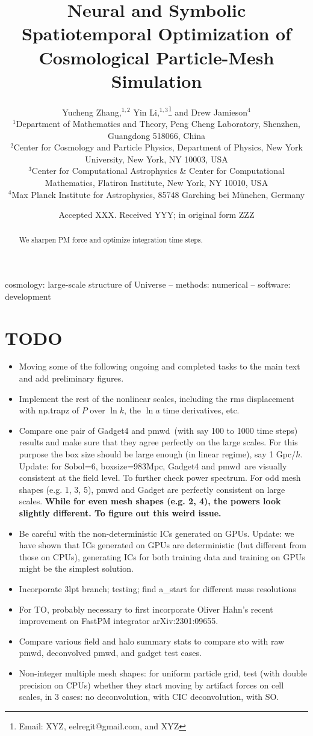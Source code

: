 \documentclass[usenatbib]{mnras}
\title[Spatiotemporally Optimized Simulation]
{Neural and Symbolic Spatiotemporal Optimization of Cosmological
Particle-Mesh Simulation}
\author[Zhang, Li, Jamieson, et al.]{
%
Yucheng Zhang,$^{1, 2}$
%
Yin Li,$^{1, 3}$\thanks{Email: XYZ, eelregit@gmail.com, and XYZ}
%
and Drew Jamieson$^{4}$
%
\\$^1$Department of Mathematics and Theory, Peng Cheng Laboratory,
Shenzhen, Guangdong 518066, China
%
\\$^2$Center for Cosmology and Particle Physics, Department of Physics,
New York University, New York, NY 10003, USA
%
\\$^3$Center for Computational Astrophysics \& Center for Computational
Mathematics, Flatiron Institute, New York, NY 10010, USA
%
\\$^4$Max Planck Institute for Astrophysics, 85748 Garching bei
M\"unchen, Germany
}
\date{Accepted XXX. Received YYY; in original form ZZZ}
\newcommand{\pmwd}{{\usefont{T1}{nova}{m}{sl}pmwd}}
\begin{document}
\label{firstpage}
\pagerange{\pageref{firstpage}--\pageref{lastpage}}
\maketitle



\begin{abstract}
We sharpen PM force and optimize integration time steps.
\end{abstract}

\begin{keywords}
cosmology: large-scale structure of Universe
-- methods: numerical
-- software: development
\end{keywords}



\section*{TODO}
\begin{itemize}
\item Moving some of the following ongoing and completed tasks to the
    main text and add preliminary figures.
\item Implement the rest of the nonlinear scales, including the rms
    displacement with np.trapz of $P$ over $\ln k$, the $\ln a$ time
    derivatives, etc.
\item Compare one pair of Gadget4 and \pmwd\ (with say 100 to 1000 time
    steps) results and make sure that they agree perfectly on the large
    scales. For this purpose the box size should be large enough (in
    linear regime), say 1 Gpc/$h$.\newline
    Update: for Sobol=6, boxsize=983Mpc, Gadget4 and \pmwd\ are visually
    consistent at the field level. To further check power spectrum. For odd mesh
    shapes (e.g. 1, 3, 5), pmwd and Gadget are perfectly consistent on large
    scales. \textbf{While for even mesh shapes (e.g. 2, 4), the powers look
    slightly different. To figure out this weird issue.}
\item Be careful with the non-deterministic ICs generated on GPUs.\newline
      Update: we have shown that ICs generated on GPUs are deterministic (but
      different from those on CPUs), generating ICs for both training data and
      training on GPUs might be the simplest solution.
\item Incorporate 3lpt branch; testing; find a\_start for different mass
  resolutions
\item For TO, probably necessary to first incorporate Oliver Hahn's
  recent improvement on FastPM integrator arXiv:2301:09655.
\item Compare various field and halo summary stats to compare sto with
  raw pmwd, deconvolved pmwd, and gadget test cases.
\item Non-integer multiple mesh shapes: for uniform particle grid, test
  (with double precision on CPUs) whether they start moving by artifact
  forces on cell scales, in 3 cases: no deconvolution, with CIC
  deconvolution, with SO.
\end{itemize}
\end{document}
